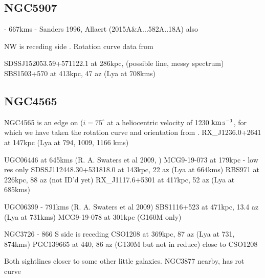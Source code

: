 \documentclass[iop]{emulateapj-rtx4}
\newcommand{\kms}{$\rm km\, s^{-1}$}
\begin{document}
\subsection{NGC5907}

 - 667kms - Sanders 1996, Allaert (2015A&A...582A..18A) also

NW is receding side \citep{allaert2015}.
Rotation curve data from \cite{yim2014}
 
SDSSJ152053.59+571122.1 at 286kpc, (possible line, messy spectrum)
SBS1503+570 at 413kpc, 47 az (Lya at 708kms)




\subsection{NGC4565}
NGC4565 is an edge on ($i = 75^{\circ}$ at a heliocentric velocity of 1230 \kms, for which we have taken the rotation curve and orientation from \cite{sofue1996}. 
RX_J1236.0+2641 at 147kpc (Lya at 794, 1009, 1166 kms)



UGC06446 at 645kms (R. A. Swaters et al 2009, \cite{verheijen2001})
MCG9-19-073 at 179kpc - low res only
SDSSJ112448.30+531818.0 at 143kpc, 22 az (Lya at 664kms)
RBS971 at 226kpc, 88 az (not ID'd yet)
RX_J1117.6+5301 at 417kpc, 52 az (Lya at 685kms)



UGC06399 - 791kms (R. A. Swaters et al 2009)
SBS1116+523 at 471kpc, 13.4 az (Lya at 731kms)
MCG9-19-078 at 301kpc (G160M only)



NGC3726 - 866
S side is receding
CSO1208 at 369kpc, 87 az (Lya at 731, 874kms)
PGC139665 at 440, 86 az (G130M but not in reduce) close to CSO1208

Both sightlines closer to some other little galaxies. NGC3877 nearby, has rot curve




\end{document}
